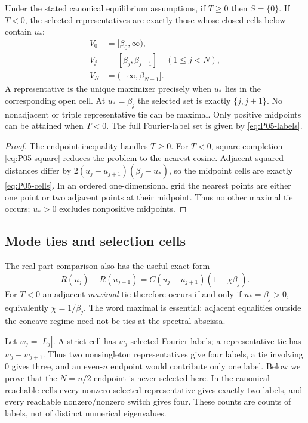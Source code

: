 \begin{theorem}
\label{thm:P05-selection}
Under the stated canonical equilibrium assumptions, if $T\ge0$ then
$S=\{0\}$. If $T<0$, the selected representatives are exactly those
whose closed cells below contain $u_*$:
\begin{align}
 V_0&=[\beta_0,\infty),\label{eq:P05-cells}\\
 V_j&=[\beta_j,\beta_{j-1}]\quad(1\le j<N),\nonumber\\
 V_N&=(-\infty,\beta_{N-1}].\nonumber
\end{align}
A representative is the unique maximizer precisely when $u_*$ lies in
the corresponding open cell. At $u_*=\beta_j$ the selected set is
exactly $\{j,j+1\}$. No nonadjacent or triple representative tie can
be maximal. Only positive midpoints can be attained when $T<0$.
The full Fourier-label set is given by \eqref{eq:P05-labels}.
\end{theorem}
\begin{proof}
The endpoint inequality handles $T\ge0$. For $T<0$, square completion
\eqref{eq:P05-square} reduces the problem to the nearest cosine.
Adjacent squared distances differ by
$2(u_j-u_{j+1})(\beta_j-u_*)$, so the midpoint cells are exactly
\eqref{eq:P05-cells}. In an ordered one-dimensional grid the nearest
points are either one point or two adjacent points at their midpoint.
Thus no other maximal tie occurs; $u_*>0$ excludes nonpositive midpoints.
\end{proof}

\subsection{Mode ties and selection cells}
\label{slot:P05-3}
The real-part comparison also has the useful exact form
\begin{equation}
 R(u_j)-R(u_{j+1})
       =C(u_j-u_{j+1})(1-\chi\beta_j).
 \label{eq:P05-adjacent-gap}
\end{equation}
For $T<0$ an adjacent \emph{maximal} tie therefore occurs if and only
if $u_*=\beta_j>0$, equivalently $\chi=1/\beta_j$.
The word maximal is essential: adjacent equalities outside the concave
regime need not be ties at the spectral abscissa.

Let $w_j=|L_j|$. A strict cell has $w_j$ selected Fourier labels; a
representative tie has $w_j+w_{j+1}$. Thus two nonsingleton
representatives give four labels, a tie involving $0$ gives three,
and an even-$n$ endpoint would contribute only one label. Below we prove
that the $N=n/2$ endpoint is never selected here. In the canonical
reachable cells every nonzero selected representative gives exactly two
labels, and every reachable nonzero/nonzero switch gives four.
These counts are counts of labels, not of distinct numerical eigenvalues.

